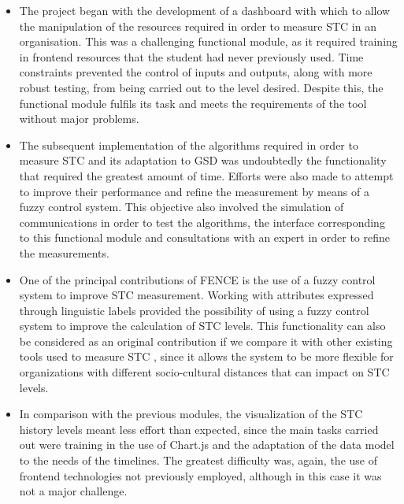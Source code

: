 \begin{itemize}
\item The project began with the development of a dashboard with which to allow the manipulation of the resources required in order to measure STC in an organisation. This was a challenging functional module, as it required training in frontend resources that the student had never previously used. Time constraints prevented the control of inputs and outputs, along with more robust testing, from being carried out to the level desired. Despite this, the functional module fulfils its task and meets the requirements of the tool without major problems.\newline

\item The subsequent implementation of the algorithms required in order to measure STC and its adaptation to GSD was undoubtedly the functionality that required the greatest amount of time. Efforts were also made to attempt to improve their performance and refine the measurement by means of a fuzzy control system. This objective also involved the simulation of communications in order to test the algorithms, the interface corresponding to this functional module and consultations with an expert in order to refine the measurements.\newline

\item One of the principal contributions of FENCE is the use of a fuzzy control system to improve STC measurement. Working with attributes expressed through linguistic labels provided the possibility of using a fuzzy control system to improve the calculation of STC levels. This functionality can also be considered as an original contribution if we compare it with other existing tools used to measure STC \cite{sierra_systematic_2018}, since it allows the system to be more flexible for organizations with different socio-cultural distances that can impact on STC levels.\newline

\item In comparison with the previous modules, the visualization of the STC history levels meant less effort than expected, since the main tasks carried out were training in the use of Chart.js and the adaptation of the data model to the needs of the timelines. The greatest difficulty was, again, the use of frontend technologies not previously employed, although in this case it was not a major challenge.\newline


\end{itemize}
